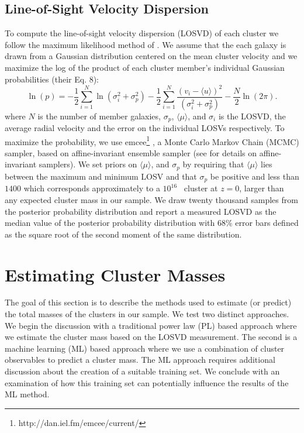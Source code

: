 \subsection{Line-of-Sight Velocity Dispersion}\label{2sec:LOSVD}
To compute the line-of-sight velocity dispersion (LOSVD) of each cluster we follow the maximum likelihood method of \cite{Walker2006}. We assume that the each galaxy is drawn from a Gaussian distribution centered on the mean cluster velocity and we maximize the log of the product of each cluster member's individual Gaussian probabilities (their Eq. 8):
\begin{equation}
  \label{2eq:log}
\ln(p)=-\frac{1}{2}\sum_{i=1}^{N}\ln(\sigma_i^2+\sigma_p^2)-\frac{1}{2}\sum_{i=1}^N\frac{(v_i-\langle u \rangle)^2}{(\sigma_i^2+\sigma_p^2)}-\frac{N}{2}\ln(2\pi).
\end{equation}
where $N$ is the number of member galaxies, $\sigma_p$, $\langle\mu\rangle$, and $\sigma_i$ is the LOSVD, the average radial velocity and the error on the individual LOSVs respectively. To maximize the probability, we use {\sc emcee}\footnote{http://dan.iel.fm/emcee/current/} \citep{Foreman-Mackey2013}, a Monte Carlo Markov Chain (MCMC) sampler, based on affine-invariant ensemble sampler (see \citealt{Goodman2010} for details on affine-invariant samplers). We set priors on $\langle\mu\rangle$, and $\sigma_p$ by requiring that $\langle\mu\rangle$ lies between the maximum and minimum LOSV and that $\sigma_p$ be positive and less than $1400$ \kms which corresponds approximately to a $10^{16}$ \Msol\ cluster at $z=0$, larger than any expected cluster mass in our sample. We draw twenty thousand samples from the posterior probability distribution and report a measured LOSVD as the median value of the posterior probability distribution with 68\% error bars defined as the square root of the second moment of the same distribution.

\section{Estimating Cluster Masses}
The goal of this section is to describe the methods used to estimate (or predict) the total masses of the clusters in our sample. We test two distinct approaches. We begin the discussion with a traditional power law (PL) based approach where we estimate the cluster mass based on the LOSVD measurement. The second is a machine learning (ML) based approach where we use a combination of cluster observables to predict a cluster mass. The ML approach requires additional discussion about the creation of a suitable training set. We conclude with an examination of how this training set can potentially influence the results of the ML method.   

